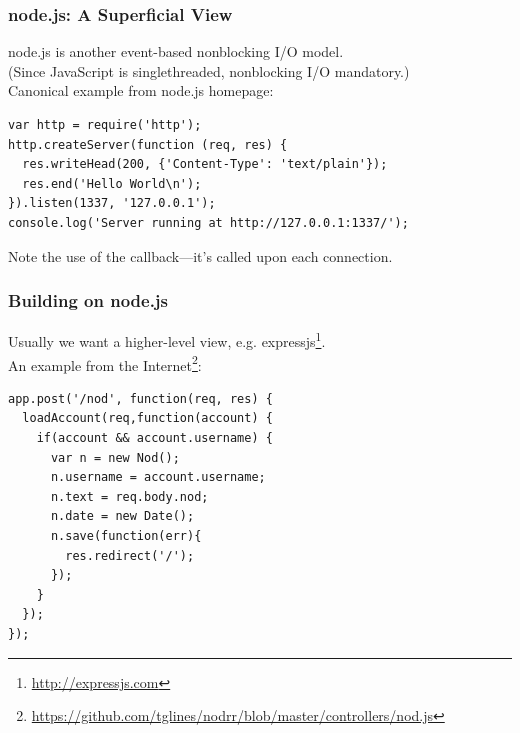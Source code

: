 \begin{frame}[fragile]
  \frametitle{node.js: A Superficial View}

   node.js is another event-based nonblocking I/O model.\\[1em]

   (Since JavaScript is singlethreaded, nonblocking I/O mandatory.)\\[1em]

Canonical example from node.js homepage:
\begin{lstlisting}
var http = require('http');
http.createServer(function (req, res) {
  res.writeHead(200, {'Content-Type': 'text/plain'});
  res.end('Hello World\n');
}).listen(1337, '127.0.0.1');
console.log('Server running at http://127.0.0.1:1337/');
\end{lstlisting}

Note the use of the callback---it's called upon each connection.

\end{frame}

\begin{frame}[fragile]
  \frametitle{Building on node.js}

Usually we want a higher-level view, e.g. expressjs\footnote{\url{http://expressjs.com}}.\\[1em]

An example from the Internet\footnote{\tiny \url{https://github.com/tglines/nodrr/blob/master/controllers/nod.js}}:
\begin{lstlisting}
app.post('/nod', function(req, res) {
  loadAccount(req,function(account) {
    if(account && account.username) {
      var n = new Nod();
      n.username = account.username;
      n.text = req.body.nod;
      n.date = new Date();
      n.save(function(err){
        res.redirect('/');
      });
    }
  });
});
\end{lstlisting}

\end{frame}

